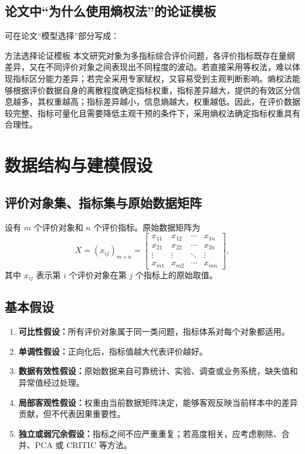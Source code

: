 \documentclass[UTF8,a4paper,12pt]{ctexart}
\begin{document}
\subsection{论文中“为什么使用熵权法”的论证模板}

可在论文“模型选择”部分写成：

\begin{methodbox}{方法选择论证模板}
本文研究对象为多指标综合评价问题，各评价指标既存在量纲差异，又在不同评价对象之间表现出不同程度的波动。若直接采用等权法，难以体现指标区分能力差异；若完全采用专家赋权，又容易受到主观判断影响。熵权法能够根据评价数据自身的离散程度确定指标权重，指标差异越大，提供的有效区分信息越多，其权重越高；指标差异越小，信息熵越大，权重越低。因此，在评价数据较完整、指标可量化且需要降低主观干预的条件下，采用熵权法确定指标权重具有合理性。
\end{methodbox}

\section{数据结构与建模假设}

\subsection{评价对象集、指标集与原始数据矩阵}

设有 $m$ 个评价对象和 $n$ 个评价指标。原始数据矩阵为
\begin{equation}
X=(x_{ij})_{m\times n}=\begin{bmatrix}
 x_{11}&x_{12}&\cdots&x_{1n}\\
 x_{21}&x_{22}&\cdots&x_{2n}\\
 \vdots&\vdots&\ddots&\vdots\\
 x_{m1}&x_{m2}&\cdots&x_{mn}
\end{bmatrix},
\end{equation}
其中 $x_{ij}$ 表示第 $i$ 个评价对象在第 $j$ 个指标上的原始取值。

\subsection{基本假设}

\begin{enumerate}
  \item \textbf{可比性假设：}所有评价对象属于同一类问题，指标体系对每个对象都适用。
  \item \textbf{单调性假设：}正向化后，指标值越大代表评价越好。
  \item \textbf{数据有效性假设：}原始数据来自可靠统计、实验、调查或业务系统，缺失值和异常值经过处理。
  \item \textbf{局部客观性假设：}权重由当前数据矩阵决定，能够客观反映当前样本中的差异贡献，但不代表因果重要性。
  \item \textbf{独立或弱冗余假设：}指标之间不应严重重复；若高度相关，应考虑剔除、合并、PCA 或 CRITIC 等方法。
\end{enumerate}
\end{document}
